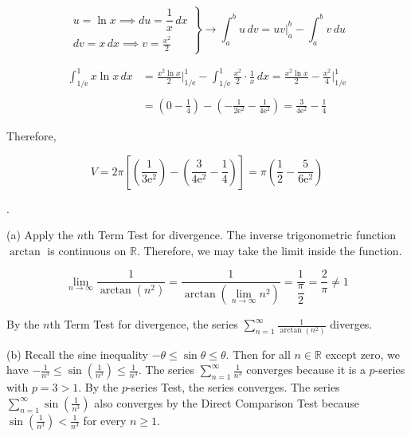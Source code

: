 \documentclass{article}
\begin{document}
\[\left.\begin{array}{c}
u=\ln x\implies du=\dfrac1x\,dx\\[1em]
dv=x\,dx\implies\displaystyle v=\frac{x^2}2
\end{array}\right\}\rightarrow\int_a^b u\,dv=uv\bigg|_a^b-\int_a^b v\,du\]

\begin{align*}\int_{1/\mathrm e}^1x\ln x\,dx&=\frac{x^2\ln x}2\Bigg|_{1/\mathrm{e}}^1-\int_{1/\mathrm{e}}^1\frac{x^2}2\cdot\frac1x\,dx=\frac{x^2\ln x}2-\frac{x^2}4\Bigg|_{1/\mathrm{e}}^1\\\\&=\left(0-\frac14\right)-\left(-\frac1{2\mathrm{e}^{2}}-\frac1{4\mathrm{e}^2}\right)=\frac3{4\mathrm{e}^2}-\frac14\end{align*}

\hfill

\noindent Therefore,

\[V=2\pi\left[\left(\frac1{3\mathrm{e}^2}\right)-\left(\frac3{4\mathrm{e}^2}-\frac14\right)\right]=\boxed{\pi\left(\frac12-\frac5{6\mathrm{e}^2}\right)}\]

\newpage

.

\hfill

\noindent (a) Apply the $n$th Term Test for divergence. The inverse trigonometric function $\arctan$ is continuous on $\mathbb{R}$. Therefore, we may take the limit inside the function.

\[\lim_{n\to\infty}\frac1{\arctan\left(n^2\right)}=\frac1{\arctan\left(\displaystyle\lim_{n\to\infty}n^2\right)}=\frac1{\dfrac\pi2}=\frac2\pi\neq1\]

\hfill

\noindent By the $n$th Term Test for divergence, the series $\displaystyle\sum_{n=1}^{\infty}\frac1{\arctan\left(n^2\right)}$ diverges.

\hfill

\hfill

\noindent (b) Recall the sine inequality $-\theta\leq\sin\theta\leq\theta$. Then for all $n\in\mathbb{R}$ except zero, we have $\displaystyle-\frac1{n^3}\leq\sin\left(\frac1{n^3}\right)\leq\frac1{n^3}$. The series $\displaystyle\sum_{n=1}^\infty\frac1{n^3}$ converges because it is a $p$-series with $p=3>1$. By the $p$-series Test, the series converges. The series $\displaystyle\sum_{n=1}^{\infty}\sin\left(\frac1{n^3}\right)$ also converges by the Direct Comparison Test because $\displaystyle\sin\left(\frac1{n^3}\right)<\frac1{n^3}$ for every $n\geq1$.
\end{document}

